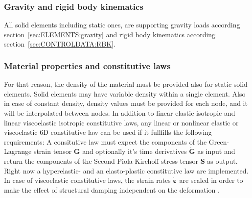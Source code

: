 \subsubsection{Gravity and rigid body kinematics}
All solid elements including static ones, are supporting gravity loads according section~\ref{sec:ELEMENTS:gravity}
and rigid body kinematics according section~\ref{sec:CONTROLDATA:RBK}.
\subsubsection{Material properties and constitutive laws}
For that reason, the density of the material must be provided also for static solid elements.
Solid elements may have variable density within a single element.
Also in case of constant density, density values must be provided for each node, and it will be interpolated between nodes.
In addition to linear elastic isotropic and linear viscoelastic isotropic constitutive laws,
any linear or nonlinear elastic or viscoelastic 6D constitutive law can be used if it fullfills the following requirements:
A consitutive law must expect the components of the Green-Lagrange strain tensor $\boldsymbol{G}$
and optionally it's time derivatives $\dot{\boldsymbol{G}}$ as input and return the components of the Second Piola-Kirchoff
stress tensor $\boldsymbol{S}$ as output. Right now a hyperelastic- and an elasto-plastic constitutive law are implemented. %
In case of viscoelastic constitutive laws, the strain rates $\dot{\boldsymbol{\varepsilon}}$ are scaled in order to make
the effect of structural damping independent on the deformation \cite{KUEBLER2005}.

